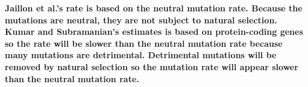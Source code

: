 \documentclass[11pt, addpoints]{exam}
\begin{document}
\begin{questions}
\ifprintanswers\vspace*{\baselineskip}
{\bfseries Jaillon et al.'s rate is based on the neutral mutation rate. Because the mutations are neutral, they are not subject to natural selection. Kumar and Subramanian's estimates is based on protein-coding genes so the rate will be slower than the neutral mutation rate because many mutations are detrimental. Detrimental mutations will be removed by natural selection so the mutation rate will appear slower than the neutral mutation rate.}
\else
\fi

\end{questions}
\end{document}
